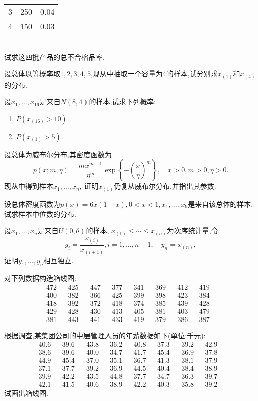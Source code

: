 \begin{xiti}
\begin{tabularx}{\textwidth}{YYY}
3&250&0.04\\
4&150&0.03\\
\bottomrule
\end{tabularx}\\[2mm]
试求这四批产品的总不合格品率.
\item 设总体以等概率取$1,2,3,4,5$,现从中抽取一个容量为4的样本,试分别求$x_{(1)}$和$x_{(4)}$的分布.
\item 设$x_1,\dotsc,x_{16}$是来自$N(8,4)$的样本,试求下列概率:
\begin{enumerate}
\item $P(x_{(16)}>10)$.
\item $P(x_{(1)}>5)$.
\end{enumerate}
\item 设总体为威布尔分布,其密度函数为
\[p(x;m,\eta)=\frac{mx^{m-1}}{\eta^m}\exp\left\{ -\left( \frac{x}{\eta} \right) ^m \right\},\quad x>0,m>0,\eta>0.\]
现从中得到样本$x_1,\dotsc,x_n$, 证明$x_{(1)}$仍复从威布尔分布,并指出其参数.
\item 设总体密度函数为$p(x)=6x(1-x),0<x<1,x_1,\dotsc,x_9$是来自该总体的样本,试求样本中位数的分布.
\item 设$x_1,\dotsc,x_n$是来自$U(0,\theta)$的样本, $x_{(1)}\leq\dotsb\leq x_{(n)}$为次序统计量,令
\[y_i=\frac{x_{(i)}}{x_{(i+1)}},i=1,\dotsc,n-1,\quad y_n=x_{(n)},\]
证明$y_1,\dotsc,y_n$相互独立.
\item 对下列数据构造箱线图:
\begin{align*}
472&&425&&447&&377&&341&&369&&412&&419&\\
400&&382&&366&&425&&399&&398&&423&&384&\\
418&&392&&372&&418&&374&&385&&439&&428&\\
429&&428&&430&&413&&405&&381&&403&&479&\\
381&&443&&441&&433&&419&&379&&386&&387&
\end{align*}
\item 根据调查,某集团公司的中层管理人员的年薪数据如下(单位:千元):
\begin{align*}
40.6&&39.6&&43.8&&36.2&&40.8&&37.3&&39.2&&42.9&\\
38.6&&39.6&&40.0&&34.7&&41.7&&45.4&&36.9&&37.8&\\
44.9&&45.4&&37.0&&35.1&&36.7&&41.3&&38.1&&37.9&\\
37.1&&37.7&&39.2&&36.9&&44.5&&40.4&&38.4&&38.9&\\
39.9&&42.2&&43.5&&44.8&&37.7&&34.7&&36.3&&39.7&\\
42.1&&41.5&&40.6&&38.9&&42.2&&40.3&&35.8&&39.2&
\end{align*}
试画出箱线图.
\end{xiti}


